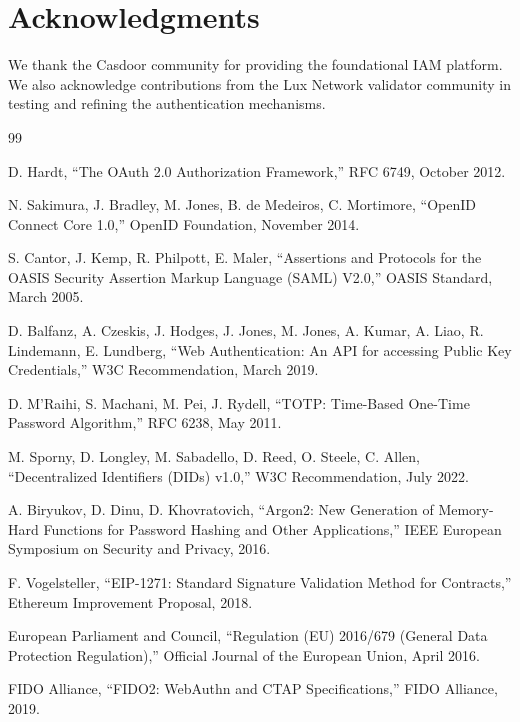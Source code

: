 \section*{Acknowledgments}


We thank the Casdoor community for providing the foundational IAM platform. We also acknowledge contributions from the Lux Network validator community in testing and refining the authentication mechanisms.

\begin{thebibliography}{99}

D. Hardt, ``The OAuth 2.0 Authorization Framework,'' RFC 6749, October 2012.

N. Sakimura, J. Bradley, M. Jones, B. de Medeiros, C. Mortimore, ``OpenID Connect Core 1.0,'' OpenID Foundation, November 2014.

S. Cantor, J. Kemp, R. Philpott, E. Maler, ``Assertions and Protocols for the OASIS Security Assertion Markup Language (SAML) V2.0,'' OASIS Standard, March 2005.

D. Balfanz, A. Czeskis, J. Hodges, J. Jones, M. Jones, A. Kumar, A. Liao, R. Lindemann, E. Lundberg, ``Web Authentication: An API for accessing Public Key Credentials,'' W3C Recommendation, March 2019.

D. M'Raihi, S. Machani, M. Pei, J. Rydell, ``TOTP: Time-Based One-Time Password Algorithm,'' RFC 6238, May 2011.

M. Sporny, D. Longley, M. Sabadello, D. Reed, O. Steele, C. Allen, ``Decentralized Identifiers (DIDs) v1.0,'' W3C Recommendation, July 2022.

A. Biryukov, D. Dinu, D. Khovratovich, ``Argon2: New Generation of Memory-Hard Functions for Password Hashing and Other Applications,'' IEEE European Symposium on Security and Privacy, 2016.

F. Vogelsteller, ``EIP-1271: Standard Signature Validation Method for Contracts,'' Ethereum Improvement Proposal, 2018.

European Parliament and Council, ``Regulation (EU) 2016/679 (General Data Protection Regulation),'' Official Journal of the European Union, April 2016.

FIDO Alliance, ``FIDO2: WebAuthn and CTAP Specifications,'' FIDO Alliance, 2019.

\end{thebibliography}

